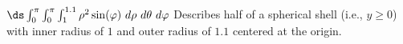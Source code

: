 {
$\ds \int_0^{\pi}\int_0^{\pi}\int_1^{1.1} \rho^2\sin(\varphi)\ d\rho\ d\theta\ d\varphi$
}
{Describes half of a spherical shell (i.e., $y\geq 0$) with inner radius of $1$ and outer radius of $1.1$ centered at the origin.
}
